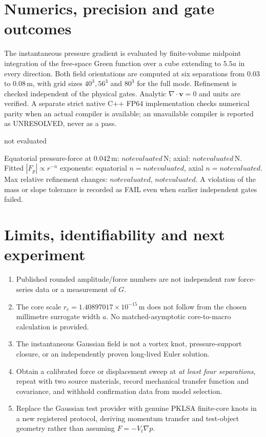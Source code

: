 \documentclass[11pt,a4paper]{article}
\newcommand{\ASLOPEX}{not evaluated}
\newcommand{\ASLOPEZ}{not evaluated}
\newcommand{\AFX}{not evaluated}
\newcommand{\AFZ}{not evaluated}
\newcommand{\AREFINEX}{not evaluated}
\newcommand{\AREFINEZ}{not evaluated}
\newcommand{\AGATES}{not evaluated}
\begin{document}
\section{Numerics, precision and gate outcomes}
The instantaneous pressure gradient is evaluated by finite-volume midpoint integration of the free-space Green function over a cube extending to $5.5 a$ in every direction. Both field orientations are computed at six separations from $0.03$ to $0.08\,\mathrm{m}$, with grid sizes $40^3,56^3$ and $80^3$ for the full mode. Refinement is checked independent of the physical gates. Analytic $\nabla\cdot\mathbf v=0$ and units are verified. A separate strict native C++ FP64 implementation checks numerical parity when an actual compiler is available; an unavailable compiler is reported as UNRESOLVED, never as a pass.

\begin{center}\AGATES\end{center}
Equatorial pressure-force at $0.042\,\mathrm m$: $\AFX\,\mathrm N$; axial: $\AFZ\,\mathrm N$. Fitted $|F_p|\propto r^{-n}$ exponents: equatorial $n=\ASLOPEX$, axial $n=\ASLOPEZ$. Max relative refinement changes: $\AREFINEX$, $\AREFINEZ$. A violation of the mass or slope tolerance is recorded as FAIL even when earlier independent gates failed.

\section{Limits, identifiability and next experiment}
\begin{enumerate}[nosep]
\item Published rounded amplitude/force numbers are not independent raw force-series data or a measurement of $G$.
\item The core scale $r_c=1.40897017\times10^{-15}\,\mathrm m$ does not follow from the chosen millimetre surrogate width $a$. No matched-asymptotic core-to-macro calculation is provided.
\item The instantaneous Gaussian field is not a vortex knot, pressure-support closure, or an independently proven long-lived Euler solution.
\item Obtain a calibrated force or displacement sweep at \emph{at least four separations}, repeat with two source materials, record mechanical transfer function and covariance, and withhold confirmation data from model selection.
\item Replace the Gaussian test provider with genuine PKLSA finite-core knots in a new registered protocol, deriving momentum transfer and test-object geometry rather than assuming $F=-V_t\nabla p$.
\end{enumerate}
\end{document}
